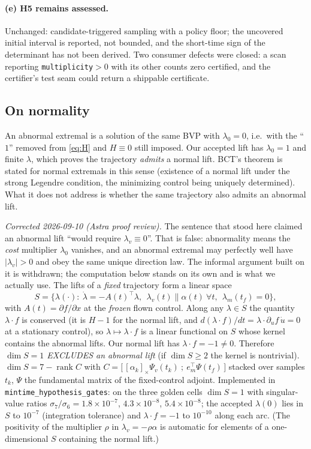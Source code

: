 \documentclass[11pt]{article}
\theoremstyle{definition}
\newcommand{\lv}{\lambda_v}
\newcommand{\lm}{\lambda_m}
\newcommand{\tf}{t_f}
\begin{document}
\paragraph{(e) H5 remains assessed.}
Unchanged: candidate-triggered sampling with a policy floor; the uncovered
initial interval is reported, not bounded, and the short-time sign of the
determinant has not been derived. Two consumer defects were closed: a scan
reporting \texttt{multiplicity}${}>0$ with its other counts zero certified,
and the certifier's test seam could return a shippable certificate.

\subsection{On normality}\label{sec:abnormal}
An abnormal extremal is a solution of the same BVP with $\lambda_0=0$, i.e.\ with
the ``$1$'' removed from \eqref{eq:H} and $H\equiv0$ still imposed. Our accepted
lift has $\lambda_0=1$ and finite $\lambda$, which proves the trajectory
\emph{admits} a normal lift. BCT's theorem is stated for normal extremals in
this sense (existence of a normal lift under the strong Legendre condition, the
minimizing control being uniquely determined). What it does not address is
whether the same trajectory also admits an abnormal lift.

\emph{Corrected 2026-09-10 (Astra proof review).} The sentence that stood here
claimed an abnormal lift ``would require $\lv\equiv0$''. That is false:
abnormality means the \emph{cost} multiplier $\lambda_0$ vanishes, and an
abnormal extremal may perfectly well have $|\lv|>0$ and obey the same unique
direction law. The informal argument built on it is withdrawn; the computation
below stands on its own and is what we actually use. The lifts of a \emph{fixed} trajectory form a
linear space
\[
S=\{\lambda(\cdot):\ \dot\lambda=-A(t)^{\!\top}\lambda,\ \ \lv(t)\parallel\alpha(t)\ \forall t,\ \ \lm(\tf)=0\},
\]
with $A(t)=\partial f/\partial x$ at the \emph{frozen} flown control. Along any
$\lambda\in S$ the quantity $\lambda\cdot f$ is conserved (it is $H-1$ for the
normal lift, and $d(\lambda\cdot f)/dt=\lambda\cdot\partial_u f\,\dot u=0$ at a
stationary control), so $\lambda\mapsto\lambda\cdot f$ is a linear functional on
$S$ whose kernel contains the abnormal lifts. Our normal lift has
$\lambda\cdot f=-1\neq0$. Therefore \emph{$\dim S=1$ EXCLUDES an abnormal lift}
(if $\dim S\ge2$ the kernel is nontrivial). $\dim S=7-\operatorname{rank}C$ with
$C=\big[\,[\alpha_k]_\times\Psi_v(t_k)\ ;\ e_m^{\!\top}\Psi(\tf)\,\big]$ stacked over
samples $t_k$, $\Psi$ the fundamental matrix of the fixed-control adjoint.
Implemented in \texttt{mintime\_hypothesis\_gates}: on the three golden cells
$\dim S=1$ with singular-value ratios $\sigma_7/\sigma_6=1.8\times10^{-7}$,
$4.3\times10^{-8}$, $5.4\times10^{-8}$; the accepted $\lambda(0)$ lies in $S$
to $10^{-7}$ (integration tolerance) and $\lambda\cdot f=-1$ to $10^{-10}$ along
each arc. (The positivity of the multiplier $\rho$ in $\lv=-\rho\alpha$ is
automatic for elements of a one-dimensional $S$ containing the normal lift.)
\end{document}
